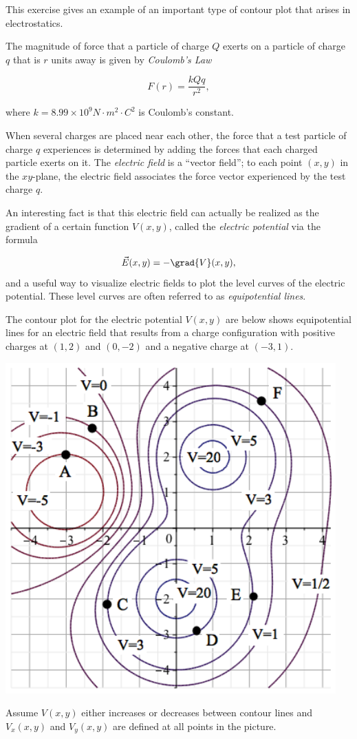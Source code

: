 \documentclass{ximera}
\author{Jim Talamo}
\begin{document}
\begin{exercise}

This exercise gives an example of an important type of contour plot that arises in electrostatics.

The magnitude of force that a particle of charge $Q$ exerts on a particle of charge $q$ that is $r$ units away is given by \emph{Coulomb's Law}

\[
F(r) = \frac{kQq}{r^2},
\] 

where $k =8.99 \times 10^9\unit{N}\cdot\unit{m}^2\cdot\unit{C}^2$ is Coulomb's constant.

When several charges are placed near each other, the force that a test particle of charge $q$ experiences is determined by adding the forces that each charged particle exerts on it.  The \emph{electric field} is a ``vector field''; to each point $(x,y)$ in the $xy$-plane, the electric field associates the force vector experienced by the test charge $q$.

An interesting fact is that this electric field can actually be realized as the gradient of a certain function $V(x,y)$, called the \emph{electric potential} via the formula

\[
\vec{E}(x,y)=-\grad{V}(x,y),
\]
and a useful way to visualize electric fields to plot the level curves of the electric potential.  These level curves are often referred to as \emph{equipotential lines}.

The contour plot for the electric potential $V(x,y)$ are below shows equipotential lines for an electric field that results from a charge configuration with positive charges at $(1,2)$ and $(0,-2)$ and a negative charge at $(-3,1)$.

\begin{image}
\includegraphics[width=5in]{contours3.png}
\end{image}
Assume $V(x,y)$ either increases or decreases between contour lines and $V_x(x,y)$ and $V_y(x,y)$ are defined at all points in the picture.


\end{exercise}
\end{document}
